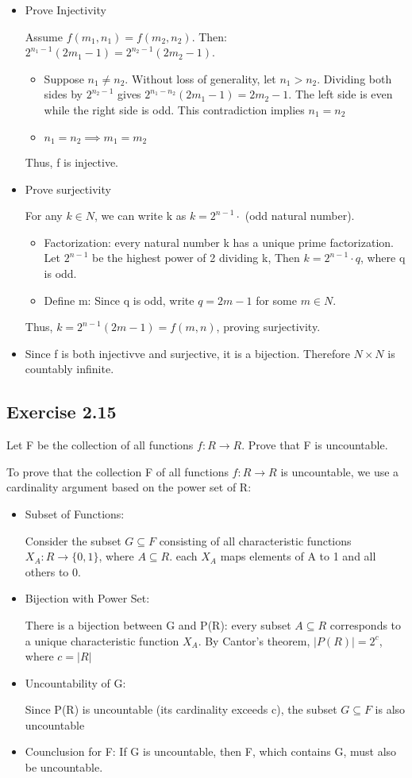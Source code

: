 \documentclass[12pt]{article}
\begin{document}
			\begin{itemize}
				\item Prove Injectivity
				
					Assume $f(m_1, n_1) = f(m_2, n_2)$. Then: $2^{n_1-1}(2m_1-1) = 2^{n_2-1}(2m_2-1)$.
					\begin{itemize}
						\item Suppose $n_1 \ne n_2$. Without loss of generality, let $n_1 > n_2$. Dividing both sides by $2^{n_2 - 1}$ gives $2^{n_1 - n_2}(2m_1 - 1) = 2m_2 - 1$. The left side is even while the right side is odd. This contradiction implies $n_1 = n_2$
						\item $n_1 = n_2 \implies m_1 = m_2$
					\end{itemize}
					Thus, f is injective.
				\item Prove surjectivity
				
					For any $k \in N$, we can write k as $k=2^{n-1} \cdot$ (odd natural number).
					\begin{itemize}
						\item Factorization: every natural number k has a unique prime factorization. Let $2^{n-1}$ be the highest power of 2 dividing k, Then $k = 2^{n-1}\cdot q$, where q is odd.
						\item Define m: Since q is odd, write $q = 2m-1$ for some $m \in N$.
					\end{itemize}
					Thus, $k = 2^{n-1}(2m-1) = f(m,n)$, proving surjectivity.
				\item Since f is both injectivve and surjective, it is a bijection. Therefore $N \times N$ is countably infinite.
			\end{itemize}
		\subsection*{Exercise 2.15}
			Let F be the collection of all functions $f:R \rightarrow R$. Prove that F is uncountable.
			
				To prove that the collection F of all functions $f: R \rightarrow R$ is uncountable, we use a cardinality argument based on the power set of R:
				\begin{itemize}
					\item Subset of Functions:
					
						Consider the subset $G \subseteq F$ consisting of all characteristic functions $X_A: R \rightarrow \{0,1\}$, where $A \subseteq R$. each $X_A$ maps elements of A to 1 and all others to 0.
					\item Bijection with Power Set:
					
						There is a bijection between G and P(R): every subset $A \subseteq R$ corresponds to a unique characteristic function $X_A$. By Cantor's theorem, $|P(R)| = 2^c$, where $c = |R|$
					\item Uncountability of G:
					
						Since P(R) is uncountable (its cardinality exceeds c), the subset $G \subseteq F$ is also uncountable
					\item Counclusion for F:
						If G is uncountable, then F, which contains G, must also be uncountable.
				\end{itemize}
\end{document}
